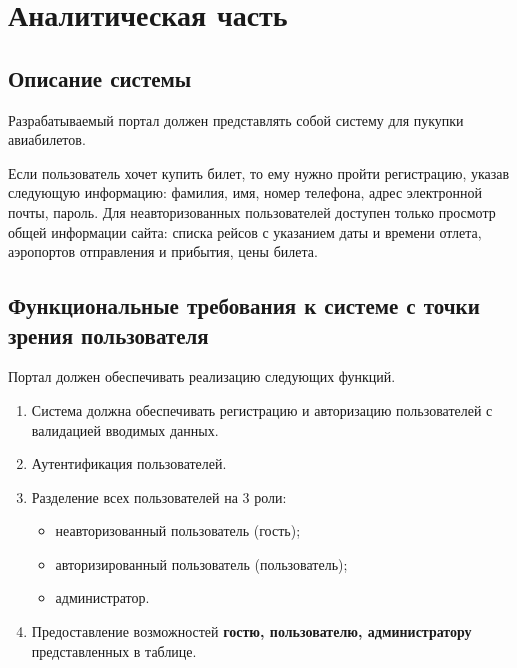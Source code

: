 \chapter{Аналитическая часть}

\section{Описание системы}
Разрабатываемый портал должен представлять собой систему для пукупки авиабилетов.

Если пользователь хочет купить билет, то ему нужно пройти регистрацию, указав следующую информацию: фамилия, имя, номер телефона, адрес электронной почты, пароль. Для неавторизованных пользователей доступен только просмотр общей информации сайта: списка рейсов с указанием даты и времени отлета, аэропортов отправления и прибытия, цены билета.


\section{Функциональные требования к системе с точки зрения пользователя}
Портал должен обеспечивать реализацию следующих функций.

\begin{enumerate}
    \item Система должна обеспечивать регистрацию и авторизацию пользователей с валидацией вводимых данных.
    \item Аутентификация пользователей.
    \item Разделение всех пользователей на 3 роли:
    \begin{itemize}
      \item неавторизованный пользователь (гость);
	    \item авторизированный пользователь (пользователь);
		  \item администратор.
	\end{itemize}

  \item Предоставление возможностей \textbf{гостю, пользователю, администратору} представленных в таблице.
\end{enumerate}

